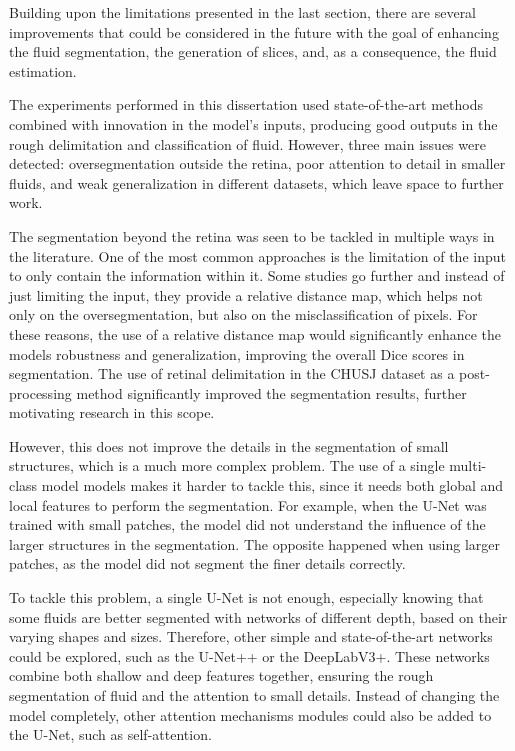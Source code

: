 Building upon the limitations presented in the last section, there are several improvements that could be considered in the future with the goal of enhancing the fluid segmentation, the generation of slices, and, as a consequence, the fluid estimation.
\par
The experiments performed in this dissertation used state-of-the-art methods combined with innovation in the model's inputs, producing good outputs in the rough delimitation and classification of fluid. However, three main issues were detected: oversegmentation outside the retina, poor attention to detail in smaller fluids, and weak generalization in different datasets, which leave space to further work.
\par
The segmentation beyond the retina was seen to be tackled in multiple ways in the literature. One of the most common approaches is the limitation of the input to only contain the information within it. Some studies go further and instead of just limiting the input, they provide a relative distance map, which helps not only on the oversegmentation, but also on the misclassification of pixels. For these reasons, the use of a relative distance map would significantly enhance the models robustness and generalization, improving the overall Dice scores in segmentation. The use of retinal delimitation in the CHUSJ dataset as a post-processing method significantly improved the segmentation results, further motivating research in this scope.
\par
However, this does not improve the details in the segmentation of small structures, which is a much more complex problem. The use of a single multi-class model models makes it harder to tackle this, since it needs both global and local features to perform the segmentation. For example, when the U-Net was trained with small patches, the model did not understand the influence of the larger structures in the segmentation. The opposite happened when using larger patches, as the model did not segment the finer details correctly.
\par
To tackle this problem, a single U-Net is not enough, especially knowing that some fluids are better segmented with networks of different depth, based on their varying shapes and sizes. Therefore, other simple and state-of-the-art networks could be explored, such as the U-Net++ or the DeepLabV3+. These networks combine both shallow and deep features together, ensuring the rough segmentation of fluid and the attention to small details. Instead of changing the model completely, other attention mechanisms modules could also be added to the U-Net, such as self-attention.
